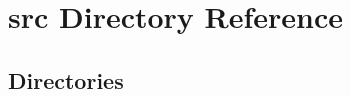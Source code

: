 \section{src Directory Reference}
\label{dir_96d553498d9584ffd97541c009cfd4b6}
\subsection*{Directories}
\begin{DoxyCompactItemize}
\end{DoxyCompactItemize}
